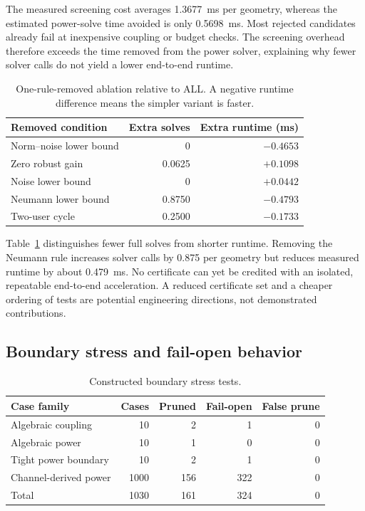 The measured screening cost averages 1.3677~ms per geometry, whereas the estimated power-solve time avoided is only 0.5698~ms. Most rejected candidates already fail at inexpensive coupling or budget checks. The screening overhead therefore exceeds the time removed from the power solver, explaining why fewer solver calls do not yield a lower end-to-end runtime.

\begin{table}[t]
\caption{One-rule-removed ablation relative to ALL. A negative runtime difference means the simpler variant is faster.}
\label{tab:ablation}
\centering\footnotesize
\begin{tabular}{lrr}
\toprule
Removed condition & Extra solves & Extra runtime (ms)\\
\midrule
Norm--noise lower bound & 0 & $-0.4653$\\
Zero robust gain & 0.0625 & $+0.1098$\\
Noise lower bound & 0 & $+0.0442$\\
Neumann lower bound & 0.8750 & $-0.4793$\\
Two-user cycle & 0.2500 & $-0.1733$\\
\bottomrule
\end{tabular}
\end{table}

Table~\ref{tab:ablation} distinguishes fewer full solves from shorter runtime. Removing the Neumann rule increases solver calls by 0.875 per geometry but reduces measured runtime by about 0.479~ms. No certificate can yet be credited with an isolated, repeatable end-to-end acceleration. A reduced certificate set and a cheaper ordering of tests are potential engineering directions, not demonstrated contributions.

\subsection{Boundary stress and fail-open behavior}
\begin{table}[t]
\caption{Constructed boundary stress tests.}
\label{tab:boundary}
\centering\footnotesize
\begin{tabular}{lrrrr}
\toprule
Case family & Cases & Pruned & Fail-open & False prune\\
\midrule
Algebraic coupling & 10 & 2 & 1 & 0\\
Algebraic power & 10 & 1 & 0 & 0\\
Tight power boundary & 10 & 2 & 1 & 0\\
Channel-derived power & 1000 & 156 & 322 & 0\\
\midrule
Total & 1030 & 161 & 324 & 0\\
\bottomrule
\end{tabular}
\end{table}

